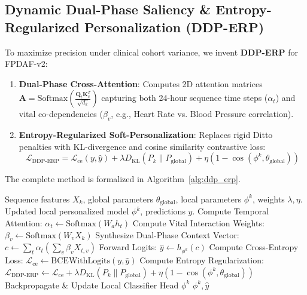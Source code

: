\documentclass[conference]{IEEEtran}
\begin{document}
\subsection{Dynamic Dual-Phase Saliency \& Entropy-Regularized Personalization (DDP-ERP)}
To maximize precision under clinical cohort variance, we invent \textbf{DDP-ERP} for FPDAF-v2:
\begin{enumerate}
\item \textbf{Dual-Phase Cross-Attention}: Computes 2D attention matrices $\mathbf{A} = \text{Softmax}\left(\frac{\mathbf{Q}_t \mathbf{K}_v^T}{\sqrt{d_k}}\right)$ capturing both 24-hour sequence time steps ($\alpha_t$) and vital co-dependencies ($\beta_v$, e.g., Heart Rate vs. Blood Pressure correlation).
\item \textbf{Entropy-Regularized Soft-Personalization}: Replaces rigid Ditto penalties with KL-divergence and cosine similarity contrastive loss:
$$\mathcal{L}_{\text{DDP-ERP}} = \mathcal{L}_{\text{ce}}(y, \hat{y}) + \lambda D_{\text{KL}}\left(P_k \parallel P_{\text{global}}\right) + \eta (1 - \cos(\phi^k, \theta_{\text{global}}))$$
\end{enumerate}
The complete method is formalized in Algorithm~\ref{alg:ddp_erp}.

\begin{algorithm}[htbp]
\caption{Proposed DDP-ERP Personalization Algorithm (Project Invention)}
\label{alg:ddp_erp}
\begin{algorithmic}[1]
\REQUIRE Sequence features $X_k$, global parameters $\theta_{\text{global}}$, local parameters $\phi^k$, weights $\lambda, \eta$.
\ENSURE Updated local personalized model $\phi^k$, predictions $\hat{y}$.
\STATE Compute Temporal Attention: $\alpha_t \leftarrow \text{Softmax}(W_a h_t)$
\STATE Compute Vital Interaction Weights: $\beta_v \leftarrow \text{Softmax}(W_v X_k)$
\STATE Synthesize Dual-Phase Context Vector: $c \leftarrow \sum_t \alpha_t (\sum_v \beta_v X_{t, v})$
\STATE Forward Logits: $\hat{y} \leftarrow h_{\phi^k}(c)$
\STATE Compute Cross-Entropy Loss: $\mathcal{L}_{\text{ce}} \leftarrow \text{BCEWithLogits}(y, \hat{y})$
\STATE Compute Entropy Regularization: $\mathcal{L}_{\text{DDP-ERP}} \leftarrow \mathcal{L}_{\text{ce}} + \lambda D_{\text{KL}}(P_k \parallel P_{\text{global}}) + \eta (1 - \cos(\phi^k, \theta_{\text{global}}))$
\STATE Backpropagate \& Update Local Classifier Head $\phi^k$
\RETURN $\phi^k, \hat{y}$
\end{algorithmic}
\end{algorithm}
\end{document}
